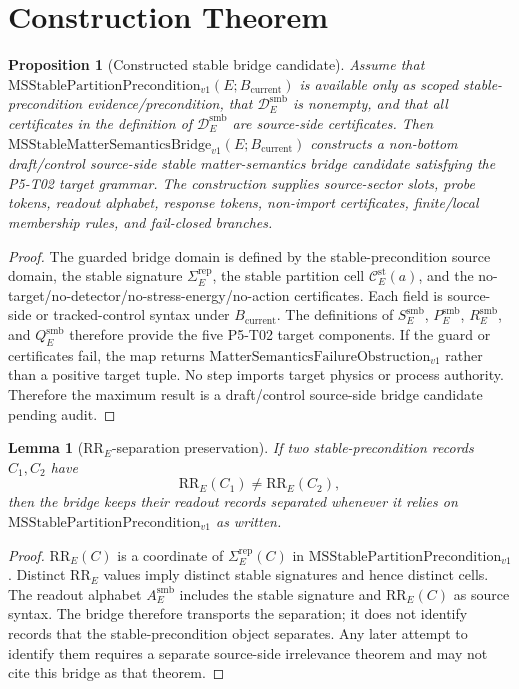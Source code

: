 \documentclass[11pt]{article}
\newcommand{\Bcur}{B_{\mathrm{current}}}
\newcommand{\MSStablePre}{\mathrm{MSStablePartitionPrecondition}_{v1}}
\newcommand{\MSBridge}{\mathrm{MSStableMatterSemanticsBridge}_{v1}}
\newcommand{\MSSig}{\Sigma^{\mathrm{rep}}_E}
\newcommand{\MSCell}{\mathcal C^{\mathrm{st}}_E}
\newcommand{\FailureObs}{\mathrm{MatterSemanticsFailureObstruction}_{v1}}
\newtheorem{proposition}{Proposition}
\newtheorem{lemma}{Lemma}
\begin{document}
\section{Construction Theorem}

\begin{proposition}[Constructed stable bridge candidate]
Assume that \(\MSStablePre(E;\Bcur)\) is available only as scoped
stable-precondition evidence/precondition, that
\(\mathcal D^{\mathrm{smb}}_E\) is nonempty, and that all certificates in the
definition of \(\mathcal D^{\mathrm{smb}}_E\) are source-side certificates.
Then \(\MSBridge(E;\Bcur)\) constructs a non-bottom draft/control
source-side stable matter-semantics bridge candidate satisfying the P5-T02
target grammar. The construction supplies source-sector slots, probe tokens,
readout alphabet, response tokens, non-import certificates, finite/local
membership rules, and fail-closed branches.
\end{proposition}

\begin{proof}
The guarded bridge domain is defined by the stable-precondition source
domain, the stable signature \(\MSSig\), the stable partition cell
\(\MSCell(a)\), and the no-target/no-detector/no-stress-energy/no-action
certificates. Each field is source-side or tracked-control syntax under
\(\Bcur\). The definitions of \(S_E^{\mathrm{smb}}\),
\(P_E^{\mathrm{smb}}\), \(R_E^{\mathrm{smb}}\), and
\(Q_E^{\mathrm{smb}}\) therefore provide the five P5-T02 target components.
If the guard or certificates fail, the map returns \(\FailureObs\) rather
than a positive target tuple. No step imports target physics or process
authority. Therefore the maximum result is a draft/control source-side bridge
candidate pending audit.
\end{proof}

\begin{lemma}[\(\mathrm{RR}_E\)-separation preservation]
If two stable-precondition records \(C_1,C_2\) have
\[
  \mathrm{RR}_E(C_1)\neq \mathrm{RR}_E(C_2),
\]
then the bridge keeps their readout records separated whenever it relies on
\(\MSStablePre\) as written.
\end{lemma}

\begin{proof}
\(\mathrm{RR}_E(C)\) is a coordinate of \(\MSSig(C)\) in
\(\MSStablePre\). Distinct \(\mathrm{RR}_E\) values imply distinct stable
signatures and hence distinct cells. The readout alphabet
\(A_E^{\mathrm{smb}}\) includes the stable signature and
\(\mathrm{RR}_E(C)\) as source syntax. The bridge therefore transports the
separation; it does not identify records that the stable-precondition object
separates. Any later attempt to identify them requires a separate source-side
irrelevance theorem and may not cite this bridge as that theorem.
\end{proof}
\end{document}
